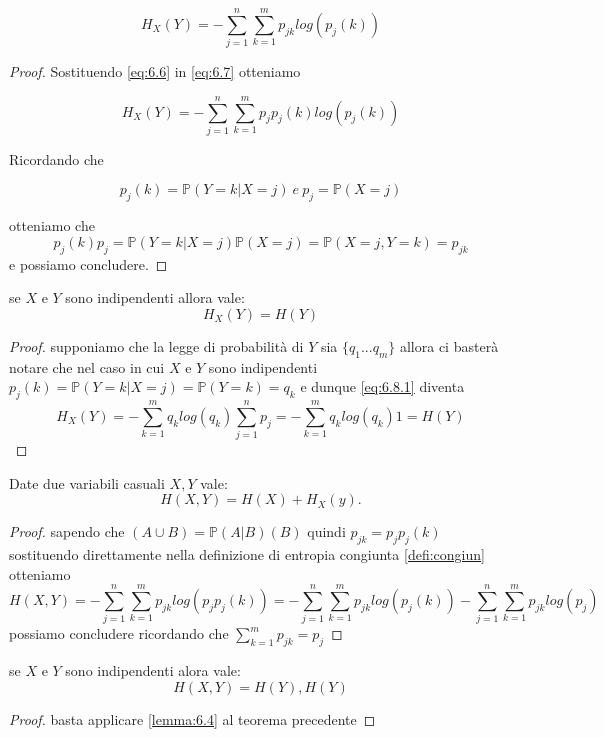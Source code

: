\begin{lem}
\begin{equation} \label{eq:6.8}
H_X(Y)=-\sum_{j=1}^n\sum_{k=1}^m p_{jk}log(p_j(k))
\end{equation}
\end{lem}
\begin{proof}
Sostituendo \ref{eq:6.6} in \ref{eq:6.7} otteniamo

\begin{equation} \label{eq:6.8.1}
H_X(Y)=-\sum_{j=1}^n\sum_{k=1}^m p_{j}p_j(k)log(p_j(k))
\end{equation}

Ricordando che 

$$p_j(k)=\mathbb{P}(Y=k|X=j)\ e \ p_j=\mathbb{P}(X=j)$$

otteniamo che 
$$p_j(k)p_j=\mathbb{P}(Y=k|X=j)\mathbb{P}(X=j)=\mathbb{P}(X=j,Y=k)=p_{jk}$$
e possiamo concludere.
\end{proof}


\begin{lem}
se $X$ e $Y$ sono indipendenti allora vale:
\begin{equation} \label{lemma:6.4}
H_X(Y)=H(Y)
\end{equation}
\end{lem}
\begin{proof}
supponiamo che la legge di probabilità di $Y$ sia $\{q_1...q_m\}$ allora ci basterà notare che nel caso in cui $X$ e $Y$ sono indipendenti $p_j(k)=\mathbb{P}(Y=k|X=j)=\mathbb{P}(Y=k)=q_k$
e dunque \ref{eq:6.8.1} diventa
$$H_X(Y)=-\sum_{k=1}^m q_klog(q_k)\sum_{j=1}^n p_{j}=-\sum_{k=1}^m q_klog(q_k)1=H(Y)$$
\end{proof}
\begin{teo} \label{teo:6.5}
Date due variabili casuali $X,Y$ vale:
\begin{equation}
H(X,Y)=H(X)+H_X(y).
\end{equation}
\end{teo}
\begin{proof}
sapendo che \p$(A\cup B)=\mathbb{P}(A|B)$\p$(B)$ quindi $p_{jk}=p_jp_j(k)$ sostituendo direttamente nella definizione di entropia congiunta \ref{defi:congiun} otteniamo
$$H(X,Y)=-\sum_{j=1}^n\sum_{k=1}^m p_{jk}log(p_{j}p_{j}(k))=-\sum_{j=1}^n\sum_{k=1}^m p_{jk}log(p_{j}(k))-\sum_{j=1}^n\sum_{k=1}^m p_{jk}log(p_{j})$$
possiamo concludere ricordando che $\sum_{k=1}^m p_{jk}=p_j$
\end{proof}
\begin{corol}
se $X$ e $Y$ sono indipendenti alora vale:
\begin{equation}
H(X,Y)=H(Y), H(Y)
\end{equation}
\end{corol}
\begin{proof}
basta applicare \ref{lemma:6.4} al teorema precedente
\end{proof}

